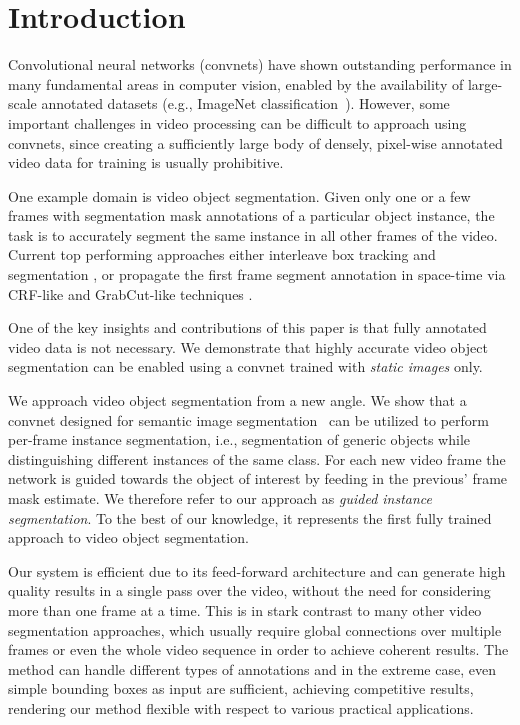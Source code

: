 \documentclass[10pt,twocolumn,letterpaper]{article}
\begin{document}
 \section{Introduction}
\label{sec:introduction}
Convolutional neural networks (convnets) have shown outstanding performance in many fundamental areas in computer vision, enabled by the availability of large-scale annotated datasets
(e.g., ImageNet classification~\cite{Krizhevsky2012Nips,Russakovsky2015Ijcv}).
However, some important challenges in video processing can be difficult to approach using convnets,
since creating a sufficiently large body of densely, pixel-wise annotated video data for training is usually prohibitive.

One example domain is video object segmentation. Given only one or a few frames with segmentation mask annotations of a particular object instance,
the task is to accurately segment the same instance in all other frames of the video.
Current top performing approaches either interleave box tracking and segmentation \cite{Xiao2016Cvpr},
or propagate the first frame segment annotation in space-time via CRF-like and GrabCut-like techniques \cite{Tsai2016Cvpr,Maerki2016Cvpr}.



One of the key insights and contributions of this paper is that fully annotated video data is not necessary.
We demonstrate that highly accurate video object segmentation can be enabled using a convnet trained with {\em static images} only.


We approach video object segmentation from a new angle.
We show that a convnet designed for semantic image segmentation~\cite{Chen2016ArxivDeeplabv2} can be utilized to perform per-frame instance segmentation,
i.e., segmentation of generic objects while distinguishing different instances of the same class.
For each new video frame the network is guided towards the object of interest by feeding in the previous' frame mask estimate.
We therefore refer to our approach as \emph{guided instance segmentation}. To the best of our knowledge, it represents the first fully trained approach to video object segmentation.



Our system is efficient due to its feed-forward architecture and can generate high quality results in a single pass over the video, without the need for considering more than one frame at a time.
This is in stark contrast to many other video segmentation approaches,
which usually require global connections over multiple frames or even the whole video sequence in order to achieve coherent results.
The method can handle different types of
annotations and in the extreme case, even simple bounding boxes as input are sufficient,
achieving competitive results, rendering our method flexible with respect to various practical applications.
\end{document}
